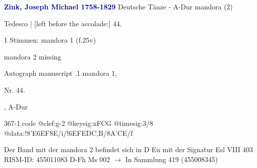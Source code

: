 \documentclass[twocolumn]{book}
\begin{document}
\newline \par \vspace{7pt} \textcolor{darkblue}{\textbf{Zink, Joseph Michael  1758-1829}}
\newline Deutsche Tänze - A-Dur
\newline mandora (2)
\newline \begin{itshape}[f.25v, at left:] Tedesco | [left before the accolade:] 44.\end{itshape} 
\newline \textcolor{darkblue}{}  1 Stimmen: mandora 1  (f.25v)
\newline \begin{small} mandora 2 missing\end{small} 
\newline Autograph manuscript
.1  mandora 1, \begin{itshape}Nr. 44.\end{itshape}, A-Dur  
\begin{filecontents*}{367-1.code}
@clef:g-2
@keysig:xFCG
@timesig:3/8
@data:!{8'E6EF}8E/i/!{6EF}{ED}{C,B}/8A'CE/f
\end{filecontents*}
\newline
%
\newline Der Band mit der mandora 2 befindet sich in D Eu mit der Signatur Esl VIII 403
\newline RISM-ID: 455011083
\newline D-Fh  Ms 002
\newline $\rightarrow$ In Sammlung 419 (455008345)
      
\end{document}
